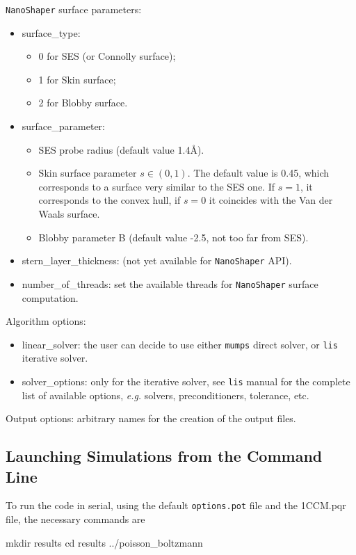 \documentclass[11pt,a4paper]{article}
\begin{document}
\bigskip
\texttt{NanoShaper} surface parameters:
\begin{itemize}
    \item surface\_type:
    \begin{itemize}
        \item 0 for SES (or Connolly surface);
        \item 1 for Skin surface;
        \item 2 for Blobby surface.
    \end{itemize}
    \item surface\_parameter:
    \begin{itemize}
        \item SES probe radius (default value 1.4\AA).
        \item Skin surface parameter $s \in (0,1)$. The default value is 0.45, which corresponds to a surface very similar to the SES one. If $s = 1$, it corresponds to the convex hull, if $s = 0$ it coincides with the Van der Waals surface. 
        \item Blobby parameter B (default value -2.5, not too far from SES). 
    \end{itemize}
    \item stern\_layer\_thickness:  (not yet available for \texttt{NanoShaper} API).
    \item number\_of\_threads: set the available threads for \texttt{NanoShaper} surface computation. 
\end{itemize}
\bigskip
Algorithm options:
\begin{itemize}
    \item linear\_solver: the user can decide to use either \texttt{mumps} direct solver, or \texttt{lis} iterative solver.
    \item solver\_options: only for the iterative solver, see \texttt{lis} manual \cite{lis_manual} for the complete list of available options, \emph{e.g.} solvers, preconditioners, tolerance, etc.  
\end{itemize}
\bigskip
Output options: arbitrary names for the creation of the output files.

\subsection{Launching Simulations from the Command Line}
To run the code in serial, using the default \texttt{options.pot} file and the 1CCM.pqr file, the necessary commands are
\begin{code}
mkdir results
cd results
../poisson_boltzmann 
\end{code}
 
\end{document}

